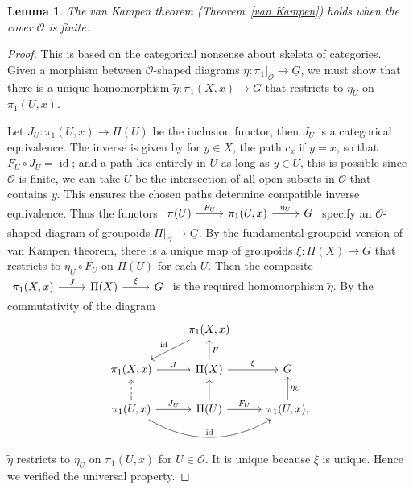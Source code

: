 \documentclass[a4paper]{amsart}
\theoremstyle{plain}
\newtheorem{lem}[thm]{Lemma}
\theoremstyle{definition}
\theoremstyle{remark}
\begin{document}
\begin{lem}
    The van Kampen theorem (Theorem~\ref{van Kampen}) holds when the cover $\mathscr{O}$ is finite.
\end{lem}
\begin{proof}
    This is based on the categorical nonsense about skeleta of categories.
    Given a morphism between $\mathscr{O}$-shaped diagrams $\eta:\pi_1|_\mathscr{O}\to\underline{G}$, we must show that there is a unique homomorphism $\tilde\eta:\pi_1(X,x)\to G$ that restricts to $\eta_U$ on $\pi_1(U,x)$.

    Let $J_U:\pi_1(U,x)\to\Pi(U)$ be the inclusion functor, then $J_U$ is a categorical equivalence.
    The inverse is given by for $y\in X$, the path $c_x$ if $y=x$, so that $F_U\circ J_U=\operatorname{id}$; and a path lies entirely in $U$ as long as $y\in U$, this is possible since $\mathscr{O}$ is finite, we can take $U$ be the intersection of all open subsets in $\mathscr{O}$ that contains $y$.
    This ensures the chosen paths determine compatible inverse equivalence.
    Thus the functors
    $\begin{tikzcd}
        \pi(U)\ar[r, "{F_U}"] & \pi_1(U,x) \ar[r, "{\eta_U}"] & G
    \end{tikzcd}$
    specify an $\mathscr{O}$-shaped diagram of groupoids $\Pi|_\mathscr{O}\to\underline{G}$.
    By the fundamental groupoid version of van Kampen theorem, there is a unique map of groupoids
    $\xi:\Pi(X)\to G$
    that restricts to $\eta_U\circ F_U$ on $\Pi(U)$ for each $U$.
    Then the composite
    $\begin{tikzcd}
        \pi_1(X,x) \ar[r, "J"] & \Pi(X) \ar[r, "\xi"] & G
    \end{tikzcd}$
    is the required homomorphism $\tilde\eta$.
    By the commutativity of the diagram
    \[\begin{tikzcd}
        \ & \pi_1(X,x) \ar[ld, "{\operatorname{id}}"'] & \ \\
        \pi_1(X,x) \ar[r, "J"] & \Pi(X) \ar[u, "F"'] \ar[r, "\xi"] & G \\
        \pi_1(U,x) \ar[u, dashed] \ar[r, "{J_U}"] \ar[rr, bend right, "{\operatorname{id}}"] & \Pi(U) \ar[u] \ar[r, "{F_U}"] & \pi_1(U,x), \ar[u, "{\eta_U}"'] 
    \end{tikzcd}\]
    $\tilde\eta$ restricts to $\eta_U$ on $\pi_1(U,x)$ for $U\in\mathscr{O}$.
    It is unique because $\xi$ is unique.
    Hence we verified the universal property.
\end{proof}
\end{document}
